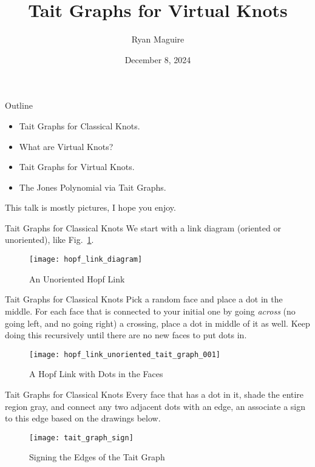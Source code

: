 \documentclass{beamer}
\title{Tait Graphs for Virtual Knots}
\author{Ryan Maguire}
\date{December 8, 2024}
\begin{document}
    \maketitle
    \begin{frame}{Outline}
        \begin{itemize}
            \item Tait Graphs for Classical Knots.
            \item What are Virtual Knots?
            \item Tait Graphs for Virtual Knots.
            \item The Jones Polynomial via Tait Graphs.
        \end{itemize}
        This talk is mostly pictures, I hope you enjoy.
    \end{frame}
    \begin{frame}{Tait Graphs for Classical Knots}
        We start with a link diagram (oriented or unoriented), like
        Fig.~\ref{fig:hopf_link_diagram}.
        \begin{figure}
            \centering
            \texttt{[image: hopf\_link\_diagram]}
            \label{fig:hopf_link_diagram}
            \caption{An Unoriented Hopf Link}
        \end{figure}
    \end{frame}
    \begin{frame}{Tait Graphs for Classical Knots}
        Pick a random face and place a dot in the middle. For each face that
        is connected to your initial one by going \textit{across} (no going
        left, and no going right) a crossing, place a dot in middle of it as
        well. Keep doing this recursively until there are no new faces to
        put dots in.
        \begin{figure}
            \centering
            \texttt{[image: hopf\_link\_unoriented\_tait\_graph\_001]}
            \label{fig:hopf_link_unoriented_tait_graph_001}
            \caption{A Hopf Link with Dots in the Faces}
        \end{figure}
    \end{frame}
    \begin{frame}{Tait Graphs for Classical Knots}
        Every face that has a dot in it, shade the entire region gray, and
        connect any two adjacent dots with an edge, an associate a sign to this
        edge based on the drawings below.
        \begin{figure}
            \centering
            \texttt{[image: tait\_graph\_sign]}
            \label{fig:tait_graph_sign}
            \caption{Signing the Edges of the Tait Graph}
        \end{figure}
    \end{frame}
\end{document}
